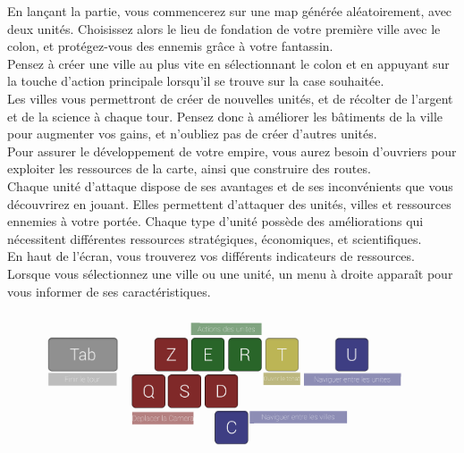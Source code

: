 \documentclass[a5paper, 10pt, twoside]{article}
\begin{document}
En lançant la partie, vous commencerez sur une map générée aléatoirement, avec
deux unités. Choisissez alors le lieu de fondation de votre première ville avec
le colon, et protégez-vous des ennemis grâce à votre fantassin.\\

Pensez à créer une ville au plus vite en sélectionnant le colon et en appuyant
sur la touche d'action principale lorsqu'il se trouve sur la case souhaitée.\\

Les villes vous permettront de créer de nouvelles unités, et de récolter de
l'argent et de la science à chaque tour. Pensez donc à améliorer les bâtiments
de la ville pour augmenter vos gains, et n'oubliez pas de créer d'autres
unités.\\

Pour assurer le développement de votre empire, vous aurez besoin d'ouvriers
pour exploiter les ressources de la carte, ainsi que construire des routes.\\

Chaque unité d'attaque dispose de ses avantages et de ses inconvénients que
vous découvrirez en jouant. Elles permettent d'attaquer des unités, villes et
ressources ennemies à votre portée. Chaque type d'unité possède des
améliorations qui nécessitent différentes ressources stratégiques, économiques,
et scientifiques.\\

En haut de l'écran, vous trouverez vos différents indicateurs de ressources.
Lorsque vous sélectionnez une ville ou une unité, un menu à droite apparaît
pour vous informer de ses caractéristiques.\\

\begin{figure}[H]
    \centering
    \includegraphics[width=0.95\textwidth]{controls}
\end{figure}
\end{document}
